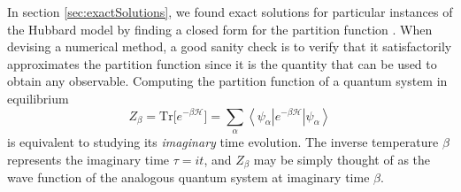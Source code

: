 In section \ref{sec:exactSolutions}, we found exact solutions for particular instances of the Hubbard model by finding a closed form for the partition function \cite{hou_numerical_2009}. When devising a numerical method, a good sanity check is to verify that it satisfactorily approximates the partition function since it is the quantity that can be used to obtain  any observable.
Computing the partition function of a quantum system in equilibrium
\begin{equation}\label{eq:partitionBeta}
Z_\beta = \text{Tr} \big[ e^{-\beta \mathcal{H} } \big] = \sum_{\alpha} \left\langle \psi_\alpha | e^{-\beta \mathcal{H} } | \psi_\alpha \right\rangle
\end{equation}
is equivalent to studying its \emph{imaginary} time evolution.
The inverse temperature $\beta$ represents the imaginary time $\tau = it$, and $Z_\beta$ may be simply thought of as the wave function of the analogous quantum system at imaginary time $\beta$.
%
%
%
%
%
